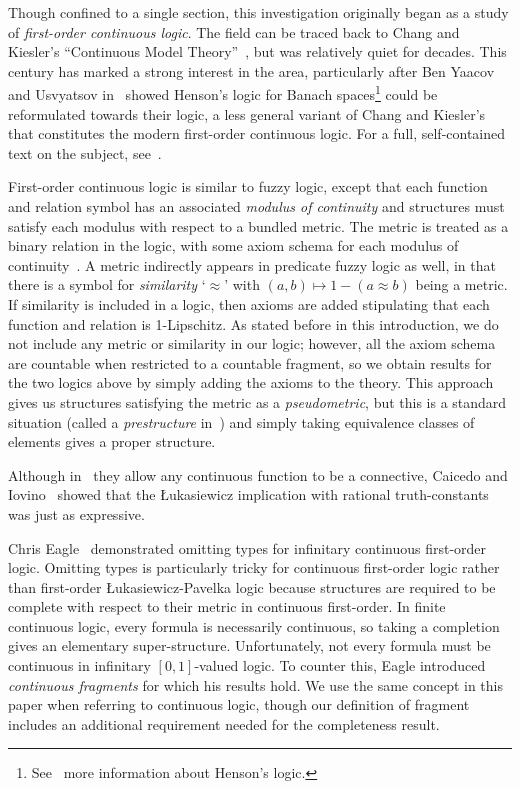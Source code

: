 \documentclass{amsart}
\theoremstyle{definition}
\numberwithin{equation}{theorem}
\newcommand{\luk}{{\L}ukasiewicz}
\begin{document}
Though confined to a single section, this investigation originally began as a study of \emph{first-order continuous logic}.
The field can be traced back to Chang and Kiesler's ``Continuous Model Theory''~\cite{chang1966continuous}, but was relatively quiet for decades.
This century has marked a strong interest in the area, particularly after Ben Yaacov and Usvyatsov in~\cite{ben2010continuous} showed Henson's logic for Banach spaces\footnote{See~\cite{henson2002ultraproducts} more information about Henson's logic.} could be reformulated towards their logic, a less general variant of Chang and Kiesler's that constitutes the modern first-order continuous logic.
For a full, self-contained text on the subject, see~\cite{yaacov2008model}.

First-order continuous logic is similar to fuzzy logic, except that each function and relation symbol has an associated \emph{modulus of continuity} and structures must satisfy each modulus with respect to a bundled metric.
The metric is treated as a binary relation in the logic, with some axiom schema for each modulus of continuity~\cite{yaacov2010proof}.
A metric indirectly appears in predicate fuzzy logic as well, in that there is a symbol for \emph{similarity} `$\approx$' with $(a,b)\mapsto 1-(a\approx b)$ being a metric.
If similarity is included in a logic, then axioms are added stipulating that each function and relation is 1-Lipschitz.
As stated before in this introduction, we do not include any metric or similarity in our logic; however, all the axiom schema are countable when restricted to a countable fragment, so we obtain results for the two logics above by simply adding the axioms to the theory.
This approach gives us structures satisfying the metric as a \emph{pseudometric}, but this is a standard situation (called a \emph{prestructure} in~\cite{yaacov2008model}) and simply taking equivalence classes of elements gives a proper structure.


Although in~\cite{ben2010continuous} they allow any continuous function to be a connective, Caicedo and Iovino~\cite{caicedo2012omitting} showed that the {\luk} implication with rational truth-constants was just as expressive.

Chris Eagle~\cite{eagle2014omitting} demonstrated omitting types for infinitary continuous first-order logic.
Omitting types is particularly tricky for continuous first-order logic rather than first-order {\luk}-Pavelka logic because structures are required to be complete with respect to their metric in continuous first-order.
In finite continuous logic, every formula is necessarily continuous, so taking a completion gives an elementary super-structure.
Unfortunately, not every formula must be continuous in infinitary $[0,1]$-valued logic.
To counter this, Eagle introduced \emph{continuous fragments} for which his results hold.
We use the same concept in this paper when referring to continuous logic, though our definition of fragment includes an additional requirement needed for the completeness result.
\end{document}
